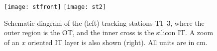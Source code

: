 \begin{figure}
  \begin{center}
    \texttt{[image: stfront]}
    \texttt{[image: st2]}
  \end{center}
  \caption[\lhcb tracking stations]
  {\small
      Schematic diagram of the (left) tracking stations T1--3, where the outer region is the OT,
      and the inner cross is the silicon IT.
      A zoom of an $x$ oriented IT layer is also shown (right).
      All units are in cm.
  }
  \label{fig:lhcb:tracking}
\end{figure}



